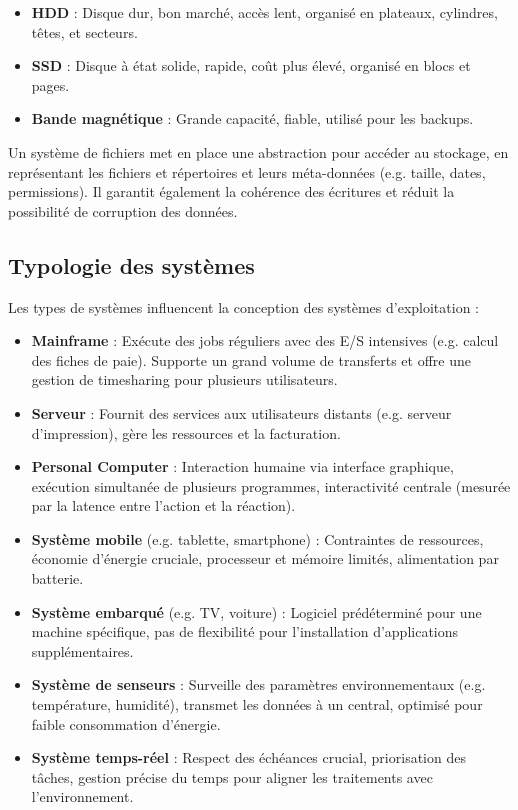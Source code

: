 \begin{itemize}
    \item \textbf{HDD} : Disque dur, bon marché, accès lent, organisé en plateaux, cylindres, têtes, et secteurs.
    \item \textbf{SSD} : Disque à état solide, rapide, coût plus élevé, organisé en blocs et pages.
    \item \textbf{Bande magnétique} : Grande capacité, fiable, utilisé pour les backups.
\end{itemize}

Un système de fichiers met en place une abstraction pour accéder au stockage, en représentant les fichiers et répertoires et leurs méta-données (e.g. taille, dates, permissions). 
Il garantit également la cohérence des écritures et réduit la possibilité de corruption des données.

\subsection{Typologie des systèmes}

Les types de systèmes influencent la conception des systèmes d'exploitation :

\begin{itemize}
    \item \textbf{Mainframe} : Exécute des jobs réguliers avec des E/S intensives (e.g. calcul des fiches de paie). 
    Supporte un grand volume de transferts et offre une gestion de timesharing pour plusieurs utilisateurs.
    \item \textbf{Serveur} : Fournit des services aux utilisateurs distants (e.g. serveur d'impression), gère les ressources et la facturation.
    \item \textbf{Personal Computer} : Interaction humaine via interface graphique, exécution simultanée de plusieurs programmes, interactivité centrale (mesurée par la latence entre l'action et la réaction).
    \item \textbf{Système mobile} (e.g. tablette, smartphone) : Contraintes de ressources, économie d'énergie cruciale, processeur et mémoire limités, alimentation par batterie.
    \item \textbf{Système embarqué} (e.g. TV, voiture) : Logiciel prédéterminé pour une machine spécifique, pas de flexibilité pour l'installation d'applications supplémentaires.
    \item \textbf{Système de senseurs} : Surveille des paramètres environnementaux (e.g. température, humidité), transmet les données à un central, optimisé pour faible consommation d'énergie.
    \item \textbf{Système temps-réel} : Respect des échéances crucial, priorisation des tâches, gestion précise du temps pour aligner les traitements avec l'environnement.
\end{itemize}

